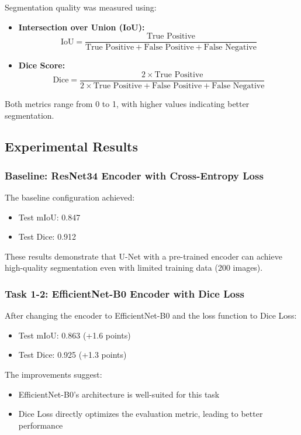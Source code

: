 \documentclass[conference]{IEEEtran}
\begin{document}
Segmentation quality was measured using:
\begin{itemize}
\item \textbf{Intersection over Union (IoU):} 
\begin{equation}
\text{IoU} = \frac{\text{True Positive}}{\text{True Positive} + \text{False Positive} + \text{False Negative}}
\end{equation}
\item \textbf{Dice Score:}
\begin{equation}
\text{Dice} = \frac{2 \times \text{True Positive}}{2 \times \text{True Positive} + \text{False Positive} + \text{False Negative}}
\end{equation}
\end{itemize}

Both metrics range from 0 to 1, with higher values indicating better segmentation.

\subsection{Experimental Results}

\subsubsection{Baseline: ResNet34 Encoder with Cross-Entropy Loss}

The baseline configuration achieved:
\begin{itemize}
\item Test mIoU: 0.847
\item Test Dice: 0.912
\end{itemize}

These results demonstrate that U-Net with a pre-trained encoder can achieve high-quality segmentation even with limited training data (200 images).

\subsubsection{Task 1-2: EfficientNet-B0 Encoder with Dice Loss}

After changing the encoder to EfficientNet-B0 and the loss function to Dice Loss:
\begin{itemize}
\item Test mIoU: 0.863 (+1.6 points)
\item Test Dice: 0.925 (+1.3 points)
\end{itemize}

The improvements suggest:
\begin{itemize}
\item EfficientNet-B0's architecture is well-suited for this task
\item Dice Loss directly optimizes the evaluation metric, leading to better performance
\end{itemize}
\end{document}
